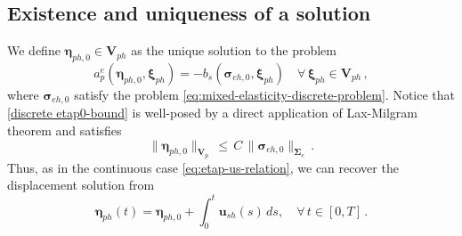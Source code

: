 \documentclass[11pt]{article}
\numberwithin{equation}{section}
\newcommand{\bbeta}{{\boldsymbol\eta}}
\newcommand{\bsi}{{\boldsymbol\sigma}}
\newcommand{\bSigma}{{\boldsymbol\Sigma}}
\newcommand{\bxi}{{\boldsymbol\xi}}
\newcommand{\bu}{\mathbf{u}}
\newcommand{\0}{{\mathbf{0}}}
\def\bV{\mathbf{V}}
\numberwithin{equation}{section}
\begin{document}

\subsection{Existence and uniqueness of a solution}
We define $\bbeta_{ph,0} \in \bV_{ph}$ as the unique solution to the problem
\begin{equation}\label{discrete etap0-bound}
a^e_p(\bbeta_{ph,0},\bxi_{ph}) = - b_s(\bsi_{eh,0},\bxi_{ph})\quad \forall\, \bxi_{ph} \in \bV_{ph} \,,
\end{equation}
where $\bsi_{eh,0}$ satisfy the problem \eqref{eq:mixed-elasticity-discrete-problem}. Notice that \eqref{discrete etap0-bound} is well-posed by a direct application of Lax-Milgram theorem and satisfies
\begin{equation}\label{discrete etap0-bound-1}
\|\bbeta_{ph,0}\|_{\bV_{p}} \,\leq\, C\,\|\bsi_{eh,0}\|_{\bSigma_{e}} \,.
\end{equation}
Thus, as in the continuous case \eqref{eq:etap-us-relation}, we can recover the displacement solution from 
\begin{equation*}
\bbeta_{ph}(t) = \bbeta_{ph,0} + \int_0^t \bu_{sh}(s) \, ds, \quad \forall \, t \in [0,T] \,.
\end{equation*}
\end{document}
